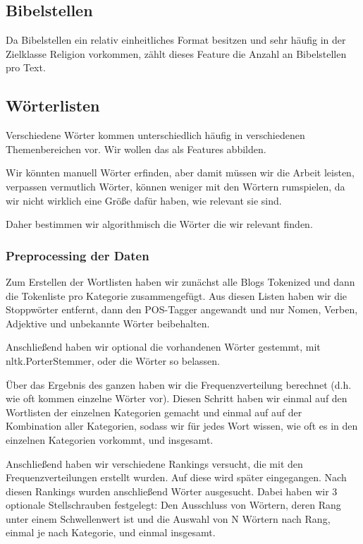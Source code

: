 \documentclass[
	11pt,
	a4paper
]{scrartcl}
\begin{document}
\subsection{Bibelstellen}\label{bibelstellen}
Da Bibelstellen ein relativ einheitliches Format besitzen und sehr häufig in der Zielklasse Religion vorkommen, zählt dieses Feature die Anzahl an Bibelstellen
pro Text.

\subsection{Wörterlisten}\label{woerterlisten}
Verschiedene Wörter kommen unterschiedlich häufig in verschiedenen Themenbereichen vor. Wir wollen das als Features abbilden.

Wir könnten manuell Wörter erfinden, aber damit müssen wir die Arbeit leisten, verpassen vermutlich Wörter, 
können weniger mit den Wörtern rumspielen, da wir nicht wirklich eine Größe dafür haben, wie relevant sie sind.

Daher bestimmen wir algorithmisch die Wörter die wir relevant finden.

\subsubsection{Preprocessing der Daten}

Zum Erstellen der Wortlisten haben wir zunächst alle Blogs Tokenized und dann die Tokenliste pro Kategorie zusammengefügt. 
Aus diesen Listen haben wir die Stoppwörter entfernt, dann den POS-Tagger angewandt und nur Nomen, Verben, Adjektive und unbekannte Wörter beibehalten.

Anschließend haben wir optional die vorhandenen Wörter gestemmt, mit nltk.PorterStemmer, oder die Wörter so belassen. 

Über das Ergebnis des ganzen haben wir die Frequenzverteilung berechnet (d.h. wie oft kommen einzelne Wörter vor). 
Diesen Schritt haben wir einmal auf den Wortlisten der einzelnen Kategorien gemacht und einmal auf auf der Kombination aller Kategorien, 
sodass wir für jedes Wort wissen, wie oft es in den einzelnen Kategorien vorkommt, und insgesamt.

Anschließend haben wir verschiedene Rankings versucht, die mit den Frequenzverteilungen erstellt wurden. 
Auf diese wird später eingegangen. Nach diesen Rankings wurden anschließend Wörter ausgesucht. 
Dabei haben wir 3 optionale Stellschrauben festgelegt: Den Ausschluss von Wörtern, 
deren Rang unter einem Schwellenwert ist und die Auswahl von N Wörtern nach Rang, einmal je nach Kategorie, und einmal insgesamt.
\end{document}

